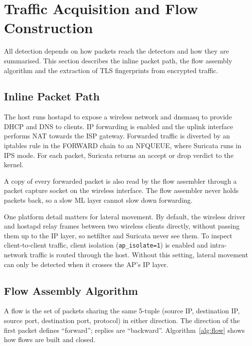 \section{Traffic Acquisition and Flow Construction}\label{sec:5.3}
\label{sec:acquisition}
\noindent All detection depends on how packets reach the detectors and how they are summarised. This section describes the inline packet path, the flow assembly algorithm and the extraction of TLS fingerprints from encrypted traffic.

\subsection{Inline Packet Path}\label{sec:5.3.1}
\label{sec:packetpath}
\noindent The host runs hostapd to expose a wireless network and dnsmasq to provide DHCP and DNS to clients. IP forwarding is enabled and the uplink interface performs NAT towards the ISP gateway. Forwarded traffic is diverted by an iptables rule in the FORWARD chain to an NFQUEUE, where Suricata runs in IPS mode. For each packet, Suricata returns an accept or drop verdict to the kernel.

\noindent A copy of every forwarded packet is also read by the flow assembler through a packet capture socket on the wireless interface. The flow assembler never holds packets back, so a slow ML layer cannot slow down forwarding.

\noindent One platform detail matters for lateral movement. By default, the wireless driver and hostapd relay frames between two wireless clients directly, without passing them up to the IP layer, so netfilter and Suricata never see them. To inspect client-to-client traffic, client isolation (\texttt{ap\_isolate=1}) is enabled and intra-network traffic is routed through the host. Without this setting, lateral movement can only be detected when it crosses the AP's IP layer.

\subsection{Flow Assembly Algorithm}\label{sec:5.3.2}
\label{sec:flowassembly}
\noindent A flow is the set of packets sharing the same 5-tuple (source IP, destination IP, source port, destination port, protocol) in either direction. The direction of the first packet defines ``forward''; replies are ``backward''. Algorithm~\ref{alg:flow} shows how flows are built and closed.

